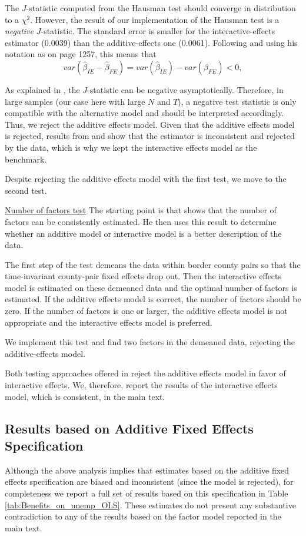 \documentclass[12pt]{article}
\newcommand{\1}{\mathbf{1}}
\begin{document}
\begin{appendix}
The $J$-statistic computed from the Hausman test should converge in distribution to a $\chi^2$. However, the result of our implementation of the Hausman test is a \emph{negative} $J$-statistic. The standard error is smaller for the interactive-effects estimator (0.0039) than the additive-effects one (0.0061). Following \citet{bai:09} and using his notation as on page 1257, this means that
$$
var(\hat{\beta}_{IE}-\hat{\beta}_{FE}) = var(\hat{\beta}_{IE}) - var(\hat{\beta}_{FE}) < 0,
$$

As explained in \citet{schreiber:08}, the $J$-statistic can be negative asymptotically. Therefore, in large samples (our case here with large $N$ and $T$), a negative test statistic is only compatible with the alternative model and should be interpreted accordingly. Thus, we reject the additive effects model. Given that the additive effects model is rejected, results from \citet{bai:09} and \citet{gobillon+magnac:13} show that the estimator is inconsistent and rejected by the data, which is why we kept the interactive effects model as the benchmark.


Despite rejecting the additive effects model with the first test, we move to the second test.

\underline{Number of factors test}
The starting point is that \citet{bai:09} shows that the number of factors can be consistently estimated. He then uses this result to determine whether an additive model or interactive model is a better description of the data.

The first step of the test demeans the data within border county pairs so that the time-invariant county-pair fixed effects drop out. Then the interactive effects model is estimated on these demeaned data and the optimal number of factors is estimated. If the additive effects model is correct, the number of factors should be zero. If the number of factors is one or larger, the additive effects model is not appropriate and the interactive effects model is preferred.

We implement this test and find two factors in the demeaned data, rejecting the additive-effects model.

Both testing approaches offered in \citet{bai:09} reject the additive effects model in favor of interactive effects. We, therefore, report the results of the interactive effects model, which is consistent, in the main text.

\subsection{Results based on Additive Fixed Effects Specification}
Although the above analysis implies that estimates based on the additive fixed effects specification are biased and inconsistent (since the model is rejected), for completeness we report a full set of results based on this specification in Table \ref{tab:Benefits_on_unemp_OLS}. These estimates do not present any substantive contradiction to any of the results based on the factor model reported in the main text.



\end{appendix}
\end{document}

